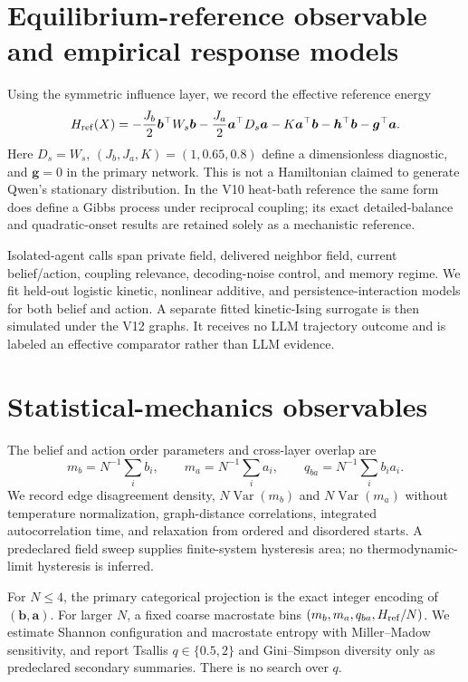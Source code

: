 \documentclass[12pt]{article}
\begin{document}
\section{Equilibrium-reference observable and empirical response models}

Using the symmetric influence layer, we record the effective reference energy
\begin{equation}
 H_{\rm ref}(X)=
 -\frac{J_b}{2}\bm b^\top W_s\bm b
 -\frac{J_a}{2}\bm a^\top D_s\bm a
 -K\bm a^\top\bm b-\bm h^\top\bm b-\bm g^\top\bm a.
 \label{eq:href}
\end{equation}
Here $D_s=W_s$, $(J_b,J_a,K)=(1,0.65,0.8)$ define a dimensionless diagnostic,
and $\bm g=0$ in the primary network. This is not a Hamiltonian claimed to
generate Qwen's stationary distribution. In the V10 heat-bath reference the
same form does define a Gibbs process under reciprocal coupling; its exact
detailed-balance and quadratic-onset results are retained solely as a mechanistic
reference.

Isolated-agent calls span private field, delivered neighbor field, current
belief/action, coupling relevance, decoding-noise control, and memory regime.
We fit held-out logistic kinetic, nonlinear additive, and persistence-interaction
models for both belief and action. A separate fitted kinetic-Ising surrogate is
then simulated under the V12 graphs. It receives no LLM trajectory outcome and
is labeled an effective comparator rather than LLM evidence.

\section{Statistical-mechanics observables}

The belief and action order parameters and cross-layer overlap are
\begin{equation}
 m_b=N^{-1}\sum_i b_i,\qquad m_a=N^{-1}\sum_i a_i,
 \qquad q_{ba}=N^{-1}\sum_i b_i a_i.
\end{equation}
We record edge disagreement density, $N\operatorname{Var}(m_b)$ and
$N\operatorname{Var}(m_a)$ without temperature normalization, graph-distance
correlations, integrated autocorrelation time, and relaxation from ordered and
disordered starts. A predeclared field sweep supplies finite-system hysteresis
area; no thermodynamic-limit hysteresis is inferred.

For $N\leq4$, the primary categorical projection is the exact integer encoding
of $(\bm b,\bm a)$. For larger $N$, a fixed coarse macrostate bins
$(m_b,m_a,q_{ba},H_{\rm ref}/N)$. We estimate Shannon configuration and
macrostate entropy with Miller--Madow sensitivity, and report Tsallis
$q\in\{0.5,2\}$ and Gini--Simpson diversity only as predeclared secondary
summaries. There is no search over $q$.
\end{document}
